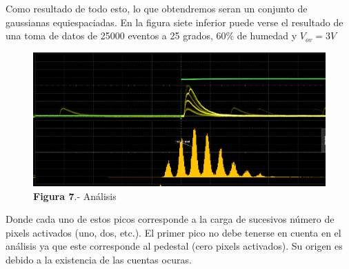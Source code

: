 Como resultado de todo esto, lo que obtendremos seran un conjunto de gaussianas equiespaciadas. En la figura siete inferior puede verse el resultado de una toma de datos de 25000 eventos a 25 grados, 60\% de humedad y $V_{ov}=3V$

\begin{figure}[hbtp]
 \centering
 \includegraphics[scale=0.4]{Analisis.png}
 \caption{\textbf{Figura 7}.- Análisis}
 \end{figure}

Donde cada uno de estos picos corresponde a la carga de sucesivos número de pixels activados (uno, dos, etc.). El primer pico no debe tenerse en cuenta en el análisis ya que este corresponde al pedestal (cero pixels activados). Su origen es debido a la existencia de las cuentas ocuras.
 
